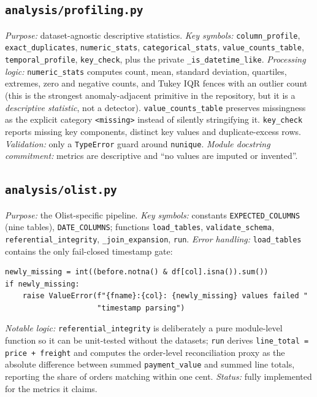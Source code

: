 \documentclass[11pt,a4paper]{article}
\newcommand{\code}[1]{\texttt{#1}}
\begin{document}
\subsection{\code{analysis/profiling.py}}
\textit{Purpose:} dataset-agnostic descriptive statistics. \textit{Key symbols:} \code{column\_profile}, \code{exact\_duplicates}, \code{numeric\_stats}, \code{categorical\_stats}, \code{value\_counts\_table}, \code{temporal\_profile}, \code{key\_check}, plus the private \code{\_is\_datetime\_like}. \textit{Processing logic:} \code{numeric\_stats} computes count, mean, standard deviation, quartiles, extremes, zero and negative counts, and Tukey IQR fences with an outlier count (this is the strongest anomaly-adjacent primitive in the repository, but it is a \emph{descriptive statistic}, not a detector). \code{value\_counts\_table} preserves missingness as the explicit category \code{<missing>} instead of silently stringifying it. \code{key\_check} reports missing key components, distinct key values and duplicate-excess rows. \textit{Validation:} only a \code{TypeError} guard around \code{nunique}. \textit{Module docstring commitment:} metrics are descriptive and ``no values are imputed or invented''.

\subsection{\code{analysis/olist.py}}
\textit{Purpose:} the Olist-specific pipeline. \textit{Key symbols:} constants \code{EXPECTED\_COLUMNS} (nine tables), \code{DATE\_COLUMNS}; functions \code{load\_tables}, \code{validate\_schema}, \code{referential\_integrity}, \code{\_join\_expansion}, \code{run}. \textit{Error handling:} \code{load\_tables} contains the only fail-closed timestamp gate:
\begin{verbatim}
newly_missing = int((before.notna() & df[col].isna()).sum())
if newly_missing:
    raise ValueError(f"{fname}:{col}: {newly_missing} values failed "
                     "timestamp parsing")
\end{verbatim}
\textit{Notable logic:} \code{referential\_integrity} is deliberately a pure module-level function so it can be unit-tested without the datasets; \code{run} derives \code{line\_total = price + freight} and computes the order-level reconciliation proxy as the absolute difference between summed \code{payment\_value} and summed line totals, reporting the share of orders matching within one cent. \textit{Status:} fully implemented for the metrics it claims.
\end{document}
